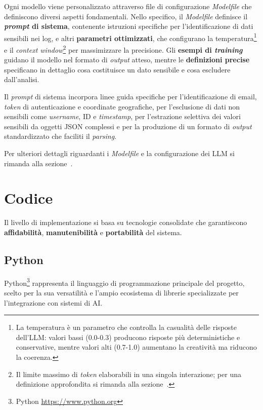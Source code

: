 \documentclass[12pt,twoside]{report}
\begin{document}
Ogni modello viene personalizzato attraverso file di configurazione \textit{Modelfile} che definiscono diversi aspetti fondamentali. Nello specifico, il \textit{Modelfile} definisce il \textbf{\textit{prompt} di sistema}, contenente istruzioni specifiche per l'identificazione di dati sensibili nei log, e altri \textbf{parametri ottimizzati}, che configurano la temperatura\footnote{La temperatura è un parametro che controlla la casualità delle risposte dell'LLM: valori bassi (0.0-0.3) producono risposte più deterministiche e conservative, mentre valori alti (0.7-1.0) aumentano la creatività ma riducono la coerenza.} e il \textit{context window}\footnote{Il limite massimo di \textit{token} elaborabili in una singola interazione; per una definizione approfondita si rimanda alla sezione~.} per massimizzare la precisione. Gli \textbf{esempi di \textit{training}} guidano il modello nel formato di \textit{output} atteso, mentre le \textbf{definizioni precise} specificano in dettaglio cosa costituisce un dato sensibile e cosa escludere dall'analisi.

Il \textit{prompt} di sistema incorpora linee guida specifiche per l'identificazione di email, \textit{token} di autenticazione e coordinate geografiche, per l'esclusione di dati non sensibili come \textit{username}, ID e \textit{timestamp}, per l'estrazione selettiva dei valori sensibili da oggetti JSON complessi e per la produzione di un formato di \textit{output} standardizzato che faciliti il \textit{parsing}.

Per ulteriori dettagli riguardanti i \textit{Modelfile} e la configurazione dei LLM si rimanda alla sezione~.


\section{Codice}
\label{sec:codice}

Il livello di implementazione si basa su tecnologie consolidate che garantiscono \textbf{affidabilità}, \textbf{manutenibilità} e \textbf{portabilità} del sistema.

\subsection{Python}
\label{subsec:python}

Python\footnote{Python \url{https://www.python.org}} rappresenta il linguaggio di programmazione principale del progetto, scelto per la sua versatilità e l'ampio ecosistema di librerie specializzate per l'integrazione con sistemi di AI.
\end{document}
